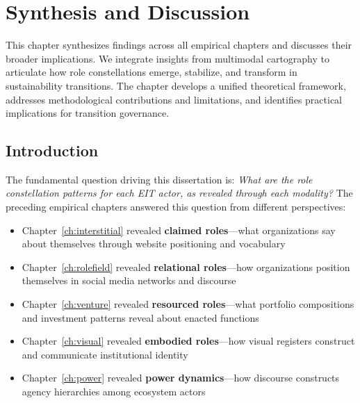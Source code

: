 \documentclass[../main.tex]{subfiles}
\begin{document}
\chapter{Synthesis and Discussion}
\margintoc

\begin{chapteroverview}
This chapter synthesizes findings across all empirical chapters and discusses their broader implications. We integrate insights from multimodal cartography to articulate how role constellations emerge, stabilize, and transform in sustainability transitions. The chapter develops a unified theoretical framework, addresses methodological contributions and limitations, and identifies practical implications for transition governance.
\end{chapteroverview}

\section{Introduction}

The fundamental question driving this dissertation is: \emph{What are the role constellation patterns for each EIT actor, as revealed through each modality?} The preceding empirical chapters answered this question from different perspectives:

\begin{itemize}[leftmargin=*, itemsep=0.3em]
\item Chapter~\ref{ch:interstitial} revealed \textbf{claimed roles}---what organizations say about themselves through website positioning and vocabulary
\item Chapter~\ref{ch:rolefield} revealed \textbf{relational roles}---how organizations position themselves in social media networks and discourse
\item Chapter~\ref{ch:venture} revealed \textbf{resourced roles}---what portfolio compositions and investment patterns reveal about enacted functions
\item Chapter~\ref{ch:visual} revealed \textbf{embodied roles}---how visual registers construct and communicate institutional identity
\item Chapter~\ref{ch:power} revealed \textbf{power dynamics}---how discourse constructs agency hierarchies among ecosystem actors
\end{itemize}
\end{document}
